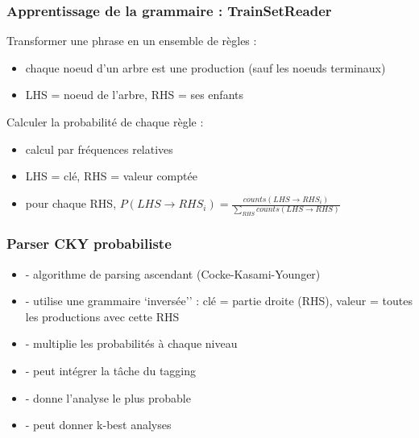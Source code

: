 \documentclass{beamer}
\begin{document}
\begin{frame}
\frametitle{Apprentissage de la grammaire : TrainSetReader}
Transformer une phrase en un ensemble de r\`egles : 
\begin{itemize}
  \item chaque noeud d'un arbre est une production (sauf les noeuds terminaux)
  \item LHS = noeud de l'arbre, RHS = ses enfants
\end{itemize}
\pause
Calculer la probabilit\'e de chaque r\`egle : 
\begin{itemize}
  \item calcul par fr\'equences relatives
  \item LHS = cl\'e, RHS = valeur compt\'ee
  \item pour chaque RHS, $P(LHS \rightarrow RHS_{i}) = \frac{counts(LHS
  \rightarrow RHS_{i})}{\sum_{RHS}counts(LHS \rightarrow RHS)}$
\end{itemize}
\end{frame}

\begin{frame}
\frametitle{Parser CKY probabiliste}
\begin{itemize}
  \item - algorithme de parsing ascendant (Cocke-Kasami-Younger)
  \item - utilise une grammaire `invers\'ee'' : cl\'e = partie droite
  (RHS), valeur = toutes les productions avec cette RHS
  \item - multiplie les probabilit\'es \`a chaque niveau
  \item - peut int\'egrer la t\^ache du tagging
  \item - donne l'analyse le plus probable
  \item - peut donner k-best analyses
\end{itemize}
\end{frame}
\end{document}
